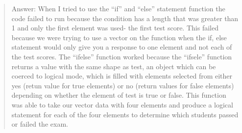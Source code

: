 \documentclass[]{article}
\begin{document}
\begin{quote}
Answer: When I tried to use the ``if'' and ``else'' statement function
the code failed to run because the condition has a length that was
greater than 1 and only the first element was used- the first test
score. This failed because we were trying to use a vector on the
function when the if, else statement would only give you a response to
one element and not each of the test scores. The ``ifelse'' function
worked because the ``ifsele'' function returns a value with the same
shape as test, an object which can be coerced to logical mode, which is
filled with elements selected from either yes (retun value for true
elements) or no (return values for false elements) depending on whether
the element of test is true or false. This function was able to take our
vector data with four elements and produce a logical statement for each
of the four elements to determine which students passed or failed the
exam.
\end{quote}
\end{document}
